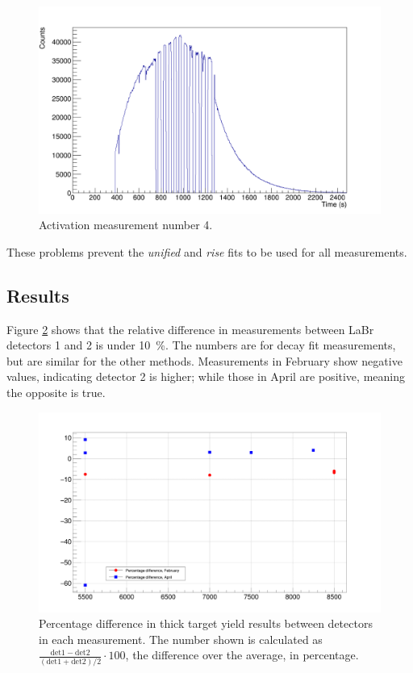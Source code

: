 \documentclass[a4paper,12pt]{report}
\begin{document}
\begin{figure}[H]
	\centering
	\includegraphics[width=\textwidth]{activation_4_time.png}
	\caption{Activation measurement number 4.}
	\label{activation_4_time}
\end{figure}

These problems prevent the \textit{unified} and \textit{rise} fits to be used for all measurements.
\\

\subsection{Results}
Figure \ref{decay_errors_rel_per} shows that the relative difference in measurements between LaBr detectors 1 and 2 is under \qty{10}{\percent}.
The numbers are for decay fit measurements, but are similar for the other methods.
Measurements in February show negative values, indicating detector 2 is higher; while those in April are positive, meaning the opposite is true.

\begin{figure}[H]
	\centering
	\includegraphics[width=\textwidth]{decay_errors_rel_per.png}
	\caption{Percentage difference in thick target yield results between detectors in each measurement.
	The number shown is calculated as $\frac{\text{det}1-\text{det}2}{\left(\text{det}1+\text{det}2\right)/2}\cdot 100$, the difference over the average, in percentage.}
	\label{decay_errors_rel_per}
\end{figure}
\end{document}
